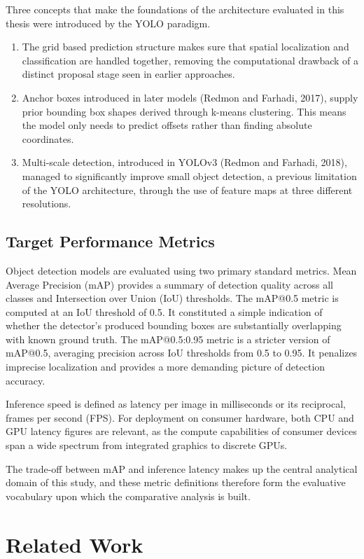 Three concepts that make the foundations of the architecture evaluated in this thesis were introduced by the YOLO paradigm. 
\begin{enumerate}
\item The grid based prediction structure makes sure that spatial localization and classification are handled together, removing the computational drawback of a distinct proposal stage seen in earlier approaches.
\item Anchor boxes introduced in later models (Redmon and Farhadi, 2017)\cite{RN07}, supply prior bounding box shapes derived through k-means clustering. This means the model only needs to predict offsets rather than finding absolute coordinates. 
\item Multi-scale detection, introduced in YOLOv3 (Redmon and Farhadi, 2018)\cite{RN08}, managed to significantly improve small object detection, a previous limitation of the YOLO architecture, through the use of feature maps at three different resolutions.
\end{enumerate}

\subsection{Target Performance Metrics}
Object detection models are evaluated using two primary standard metrics. Mean Average Precision (mAP) provides a summary of detection quality across all classes and Intersection over Union (IoU) thresholds. The mAP@0.5 metric is computed at an IoU threshold of 0.5. It constituted a simple indication of whether the detector’s produced bounding boxes are substantially overlapping with known ground truth. The mAP@0.5:0.95 metric is a stricter version of mAP@0.5, averaging precision across IoU thresholds from 0.5 to 0.95. It penalizes imprecise localization and provides a more demanding picture of detection accuracy.

Inference speed is defined as latency per image in milliseconds or its reciprocal, frames per second (FPS). For deployment on consumer hardware, both CPU and GPU latency figures are relevant, as the compute capabilities of consumer devices span a wide spectrum from integrated graphics to discrete GPUs. 

The trade-off between mAP and inference latency makes up the central analytical domain of this study, and these metric definitions therefore form the evaluative vocabulary upon which the comparative analysis is built.

\section{Related Work}

